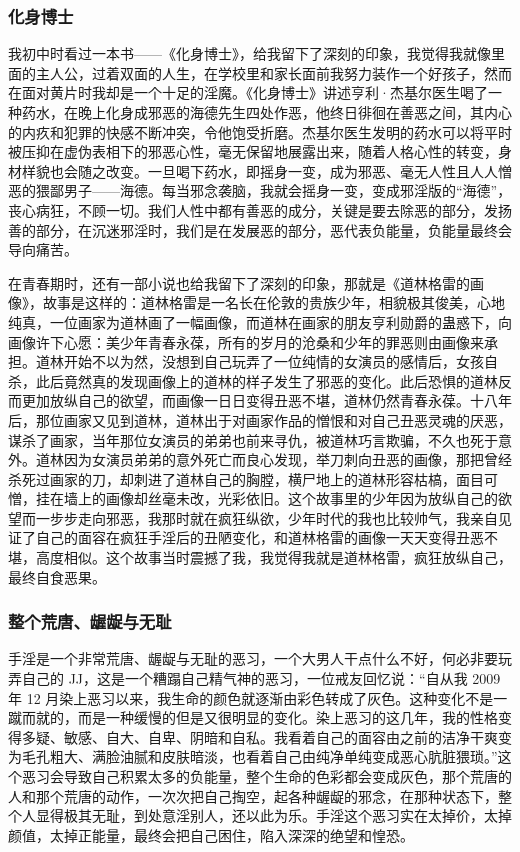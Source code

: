 \subsubsection{化身博士}

我初中时看过一本书——《化身博士》，给我留下了深刻的印象，我觉得我就像里面的主人公，过着双面的人生，在学校里和家长面前我努力装作一个好孩子，然而在面对黄片时我却是一个十足的淫魔。《化身博士》讲述亨利·杰基尔医生喝了一种药水，在晚上化身成邪恶的海德先生四处作恶，他终日徘徊在善恶之间，其内心的内疚和犯罪的快感不断冲突，令他饱受折磨。杰基尔医生发明的药水可以将平时被压抑在虚伪表相下的邪恶心性，毫无保留地展露出来，随着人格心性的转变，身材样貌也会随之改变。一旦喝下药水，即摇身一变，成为邪恶、毫无人性且人人憎恶的猥鄙男子——海德。每当邪念袭脑，我就会摇身一变，变成邪淫版的“海德”，丧心病狂，不顾一切。我们人性中都有善恶的成分，关键是要去除恶的部分，发扬善的部分，在沉迷邪淫时，我们是在发展恶的部分，恶代表负能量，负能量最终会导向痛苦。

在青春期时，还有一部小说也给我留下了深刻的印象，那就是《道林格雷的画像》，故事是这样的：道林格雷是一名长在伦敦的贵族少年，相貌极其俊美，心地纯真，一位画家为道林画了一幅画像，而道林在画家的朋友亨利勋爵的蛊惑下，向画像许下心愿：美少年青春永葆，所有的岁月的沧桑和少年的罪恶则由画像来承担。道林开始不以为然，没想到自己玩弄了一位纯情的女演员的感情后，女孩自杀，此后竟然真的发现画像上的道林的样子发生了邪恶的变化。此后恐惧的道林反而更加放纵自己的欲望，而画像一日日变得丑恶不堪，道林仍然青春永葆。十八年后，那位画家又见到道林，道林出于对画家作品的憎恨和对自己丑恶灵魂的厌恶，谋杀了画家，当年那位女演员的弟弟也前来寻仇，被道林巧言欺骗，不久也死于意外。道林因为女演员弟弟的意外死亡而良心发现，举刀刺向丑恶的画像，那把曾经杀死过画家的刀，却刺进了道林自己的胸膛，横尸地上的道林形容枯槁，面目可憎，挂在墙上的画像却丝毫未改，光彩依旧。这个故事里的少年因为放纵自己的欲望而一步步走向邪恶，我那时就在疯狂纵欲，少年时代的我也比较帅气，我亲自见证了自己的面容在疯狂手淫后的丑陋变化，和道林格雷的画像一天天变得丑恶不堪，高度相似。这个故事当时震撼了我，我觉得我就是道林格雷，疯狂放纵自己，最终自食恶果。

\subsubsection{整个荒唐、龌龊与无耻}

手淫是一个非常荒唐、龌龊与无耻的恶习，一个大男人干点什么不好，何必非要玩弄自己的 JJ，这是一个糟蹋自己精气神的恶习，一位戒友回忆说：“自从我 2009 年 12 月染上恶习以来，我生命的颜色就逐渐由彩色转成了灰色。这种变化不是一蹴而就的，而是一种缓慢的但是又很明显的变化。染上恶习的这几年，我的性格变得多疑、敏感、自大、自卑、阴暗和自私。我看着自己的面容由之前的洁净干爽变为毛孔粗大、满脸油腻和皮肤暗淡，也看着自己由纯净单纯变成恶心肮脏猥琐。”这个恶习会导致自己积累太多的负能量，整个生命的色彩都会变成灰色，那个荒唐的人和那个荒唐的动作，一次次把自己掏空，起各种龌龊的邪念，在那种状态下，整个人显得极其无耻，到处意淫别人，还以此为乐。手淫这个恶习实在太掉价，太掉颜值，太掉正能量，最终会把自己困住，陷入深深的绝望和惶恐。

